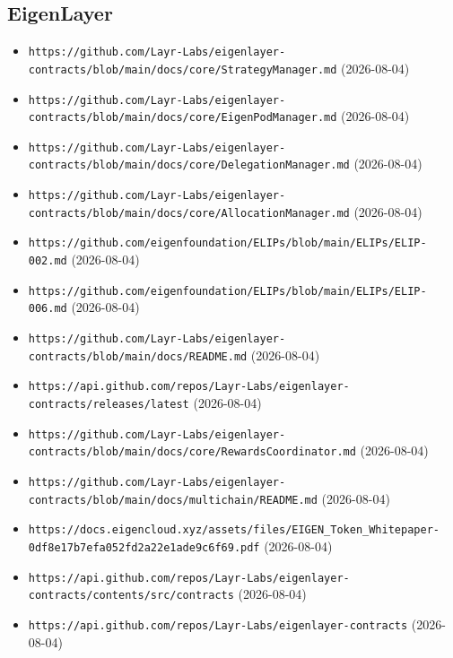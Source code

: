 \subsection*{EigenLayer}
\begin{itemize}\setlength{\itemsep}{0pt}\small
\item \texttt{https://github.com/Layr-Labs/eigenlayer-contracts/blob/main/docs/core/StrategyManager.md} (2026-08-04)
\item \texttt{https://github.com/Layr-Labs/eigenlayer-contracts/blob/main/docs/core/EigenPodManager.md} (2026-08-04)
\item \texttt{https://github.com/Layr-Labs/eigenlayer-contracts/blob/main/docs/core/DelegationManager.md} (2026-08-04)
\item \texttt{https://github.com/Layr-Labs/eigenlayer-contracts/blob/main/docs/core/AllocationManager.md} (2026-08-04)
\item \texttt{https://github.com/eigenfoundation/ELIPs/blob/main/ELIPs/ELIP-002.md} (2026-08-04)
\item \texttt{https://github.com/eigenfoundation/ELIPs/blob/main/ELIPs/ELIP-006.md} (2026-08-04)
\item \texttt{https://github.com/Layr-Labs/eigenlayer-contracts/blob/main/docs/README.md} (2026-08-04)
\item \texttt{https://api.github.com/repos/Layr-Labs/eigenlayer-contracts/releases/latest} (2026-08-04)
\item \texttt{https://github.com/Layr-Labs/eigenlayer-contracts/blob/main/docs/core/RewardsCoordinator.md} (2026-08-04)
\item \texttt{https://github.com/Layr-Labs/eigenlayer-contracts/blob/main/docs/multichain/README.md} (2026-08-04)
\item \texttt{https://docs.eigencloud.xyz/assets/files/EIGEN\_Token\_Whitepaper-0df8e17b7efa052fd2a22e1ade9c6f69.pdf} (2026-08-04)
\item \texttt{https://api.github.com/repos/Layr-Labs/eigenlayer-contracts/contents/src/contracts} (2026-08-04)
\item \texttt{https://api.github.com/repos/Layr-Labs/eigenlayer-contracts} (2026-08-04)
\end{itemize}

